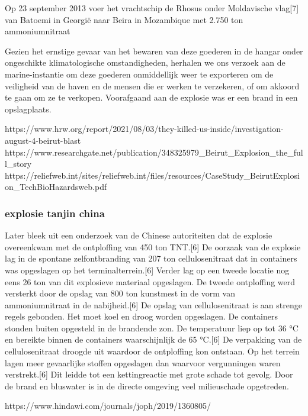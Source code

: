 Op 23 september 2013 voer het vrachtschip de Rhosus onder Moldavische vlag[7] van Batoemi in Georgië naar Beira in Mozambique met 2.750 ton ammoniumnitraat

Gezien het ernstige gevaar van het bewaren van deze goederen in de hangar onder ongeschikte klimatologische omstandigheden, herhalen we ons verzoek aan de marine-instantie om deze goederen onmiddellijk weer te exporteren om de veiligheid van de haven en de mensen die er werken te verzekeren, of om akkoord te gaan om ze te verkopen.
Voorafgaand aan de explosie was er een brand in een opslagplaats. 

https://www.hrw.org/report/2021/08/03/they-killed-us-inside/investigation-august-4-beirut-blast 
https://www.researchgate.net/publication/348325979_Beirut_Explosion_the_full_story 
https://reliefweb.int/sites/reliefweb.int/files/resources/CaseStudy_BeirutExplosion_TechBioHazardsweb.pdf 
\subsubsection{explosie tanjin china 
}

Later bleek uit een onderzoek van de Chinese autoriteiten dat de explosie overeenkwam met de ontploffing van 450 ton TNT.[6] 
De oorzaak van de explosie lag in de spontane zelfontbranding van 207 ton cellulosenitraat dat in containers was opgeslagen op het terminalterrein.[6] 
Verder lag op een tweede locatie nog eens 26 ton van dit explosieve materiaal opgeslagen.
De tweede ontploffing werd versterkt door de opslag van 800 ton kunstmest in de vorm van ammoniumnitraat in de nabijheid.[6]
De opslag van cellulosenitraat is aan strenge regels gebonden. Het moet koel en droog worden opgeslagen. De containers stonden buiten opgesteld in de brandende zon. De temperatuur liep op tot 36 °C en bereikte binnen de containers waarschijnlijk de 65 °C.[6] De verpakking van de cellulosenitraat droogde uit waardoor de ontploffing kon ontstaan. Op het terrein lagen meer gevaarlijke stoffen opgeslagen dan waarvoor vergunningen waren verstrekt.[6] Dit leidde tot een kettingreactie met grote schade tot gevolg. Door de brand en bluswater is in de directe omgeving veel milieuschade opgetreden.


https://www.hindawi.com/journals/joph/2019/1360805/ 

